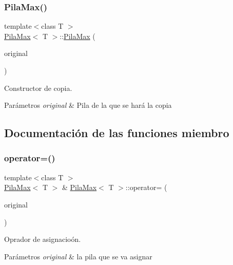 \subsubsection{\texorpdfstring{Pila\+Max()}{PilaMax()}}
{\footnotesize\ttfamily template$<$class T $>$ \\
\hyperlink{classPilaMax}{Pila\+Max}$<$ T $>$\+::\hyperlink{classPilaMax}{Pila\+Max} (\begin{DoxyParamCaption}\item[{const \hyperlink{classPilaMax}{Pila\+Max}$<$ T $>$ \&}]{original }\end{DoxyParamCaption})}



Constructor de copia. 


\begin{DoxyParams}{Parámetros}
{\em original} & Pila de la que se hará la copia \\
\hline
\end{DoxyParams}


\subsection{Documentación de las funciones miembro}
\mbox{\label{classPilaMax_a4a2247953a5c68c37eb0f56440988e87}} 
\subsubsection{\texorpdfstring{operator=()}{operator=()}}
{\footnotesize\ttfamily template$<$class T $>$ \\
\hyperlink{classPilaMax}{Pila\+Max}$<$ T $>$ \& \hyperlink{classPilaMax}{Pila\+Max}$<$ T $>$\+::operator= (\begin{DoxyParamCaption}\item[{const \hyperlink{classPilaMax}{Pila\+Max}$<$ T $>$ \&}]{original }\end{DoxyParamCaption})}



Oprador de asignacioón. 


\begin{DoxyParams}{Parámetros}
{\em original} & la pila que se va asignar \\
\hline
\end{DoxyParams}
\mbox{\label{classPilaMax_a8d444d7757bf2fd488d5ed8f34a942e0}} 
